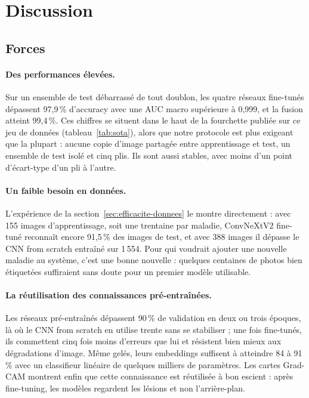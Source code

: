 \section{Discussion}
\label{sec:discussion}

\subsection{Forces}

\paragraph{Des performances élevées.} Sur un ensemble de test débarrassé de tout doublon, les quatre réseaux fine-tunés dépassent 97,9\,\% d'accuracy avec une AUC macro supérieure à 0,999, et la fusion atteint 99,4\,\%. Ces chiffres se situent dans le haut de la fourchette publiée sur ce jeu de données (tableau~\ref{tab:sota}), alors que notre protocole est plus exigeant que la plupart : aucune copie d'image partagée entre apprentissage et test, un ensemble de test isolé et cinq plis. Ils sont aussi stables, avec moins d'un point d'écart-type d'un pli à l'autre.

\paragraph{Un faible besoin en données.} L'expérience de la section~\ref{sec:efficacite-donnees} le montre directement : avec 155 images d'apprentissage, soit une trentaine par maladie, ConvNeXtV2 fine-tuné reconnaît encore 91,5\,\% des images de test, et avec 388 images il dépasse le CNN from scratch entraîné sur 1\,554. Pour qui voudrait ajouter une nouvelle maladie au système, c'est une bonne nouvelle : quelques centaines de photos bien étiquetées suffiraient sans doute pour un premier modèle utilisable.

\paragraph{La réutilisation des connaissances pré-entraînées.} Les réseaux pré-entraînés dépassent 90\,\% de validation en deux ou trois époques, là où le CNN from scratch en utilise trente sans se stabiliser ; une fois fine-tunés, ils commettent cinq fois moins d'erreurs que lui et résistent bien mieux aux dégradations d'image. Même gelés, leurs embeddings suffisent à atteindre 84 à 91\,\% avec un classifieur linéaire de quelques milliers de paramètres. Les cartes Grad-CAM montrent enfin que cette connaissance est réutilisée à bon escient : après fine-tuning, les modèles regardent les lésions et non l'arrière-plan.

